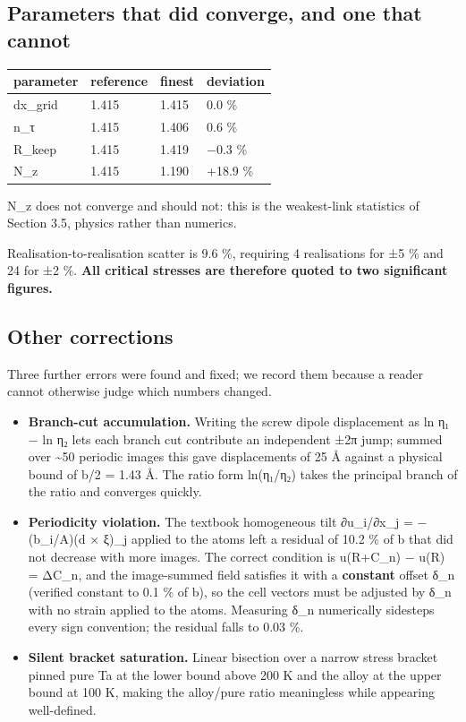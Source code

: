\hypertarget{parameters-that-did-converge-and-one-that-cannot}{%
\subsection{Parameters that did converge, and one that cannot}\label{sec:parameters-that-did-converge-and-one-that-cannot}}

\begin{longtable}[]{@{}llll@{}}
\toprule\noalign{}
parameter & reference & finest & deviation \\
\midrule\noalign{}
\endhead
\bottomrule\noalign{}
\endlastfoot
dx\_grid & 1.415 & 1.415 & 0.0 \% \\
n\_τ & 1.415 & 1.406 & 0.6 \% \\
R\_keep & 1.415 & 1.419 & −0.3 \% \\
N\_z & 1.415 & 1.190 & +18.9 \% \\
\end{longtable}

N\_z does not converge and should not: this is the weakest-link statistics of Section 3.5, physics rather than numerics.

Realisation-to-realisation scatter is 9.6 \%, requiring 4 realisations for ±5 \% and 24 for ±2 \%. \textbf{All critical stresses are therefore quoted to two significant figures.}

\hypertarget{other-corrections}{%
\subsection{Other corrections}\label{sec:other-corrections}}

Three further errors were found and fixed; we record them because a reader cannot otherwise judge which numbers changed.

\begin{itemize}
\tightlist
\item
  \textbf{Branch-cut accumulation.} Writing the screw dipole displacement as ln η₁ − ln η₂ lets each branch cut contribute an independent ±2π jump; summed over \textasciitilde50 periodic images this gave displacements of 25 Å against a physical bound of \textbar b\textbar/2 = 1.43 Å. The ratio form ln(η₁/η₂) takes the principal branch of the ratio and converges quickly.
\item
  \textbf{Periodicity violation.} The textbook homogeneous tilt ∂u\_i/∂x\_j = −(b\_i/A)(d × ξ)\_j applied to the atoms left a residual of 10.2 \% of \textbar b\textbar{} that did not decrease with more images. The correct condition is u(R+C\_n) − u(R) = ΔC\_n, and the image-summed field satisfies it with a \textbf{constant} offset δ\_n (verified constant to 0.1 \% of \textbar b\textbar), so the cell vectors must be adjusted by δ\_n with no strain applied to the atoms. Measuring δ\_n numerically sidesteps every sign convention; the residual falls to 0.03 \%.
\item
  \textbf{Silent bracket saturation.} Linear bisection over a narrow stress bracket pinned pure Ta at the lower bound above 200 K and the alloy at the upper bound at 100 K, making the alloy/pure ratio meaningless while appearing well-defined.
\end{itemize}

